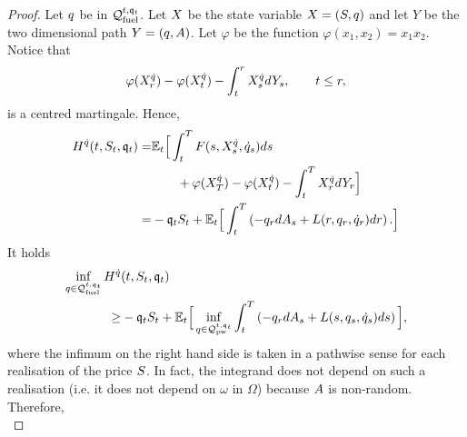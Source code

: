 \documentclass[10pt,a4paper]{article}
\begin{document}
\begin{proof}
Let $q$ be in $\mathcal{Q}_{\text{fuel}}^{t,\mathfrak{q}_t}$. Let $X$ be the state variable  $X = (S,q)$ and let $Y$ be the two dimensional path $Y=(q,A)$. Let $\varphi$ be the function $\varphi(x_1,x_2)=x_1 x_2$. Notice that 
\begin{equation*}
\varphi(X^{\dot{q}}_{r} ) - \varphi(X^{\dot{q}}_{t})
-\int_{t}^{r}X^{\dot{q}}_s dY_s, \qquad t\leq r,
\end{equation*}
is a centred martingale. Hence,
\begin{equation*}
\begin{split}
H^{\dot{q}} (t,S_t,\mathfrak{q}_t) = &
\mathbb{{E}}_t \Big[
\int_{t}^{T} F(s,X^{\dot{q}}_s, \dot{q}_s) ds \\
& \qquad + \varphi (X^{\dot{q}}_T)
- \varphi (X^{\dot{q}}_t)
-\int_{t}^{T} X^{\dot{q}}_r dY_r 
\Big] \\
=& - \mathfrak{q}_t S_t 
+\mathbb{{E}}_t \Big[
\int_{t}^{T} \left(-q_r dA_s + L(r,q_r,\dot{q}_r)dr\right).
\Big]
\end{split}
\end{equation*}
It holds
\begin{equation*}
\begin{split}
\inf_{q\in \mathcal{Q}_{\text{fuel}}^{t,\mathfrak{q}_t}}
H^{\dot{q}} &(t,S_t,\mathfrak{q}_t)\\
\geq& 
-\mathfrak{q}_t S_t
+ \mathbb{{E}}_t \Big[
\inf_{q \in \mathcal{Q}_{\text{pw}}^{t,\mathfrak{q}_t}}
\int_{t}^{T} \left(-q_r dA_s + L(s,q_s,\dot{q}_s)ds\right)
\Big],
\end{split}
\end{equation*}
where the infimum on the right hand side is taken in a pathwise sense for each realisation of the price $S$. In fact, the integrand does not depend on such a realisation (i.e. it does not depend on $\omega$ in $\Omega$) because $A$ is non-random. Therefore, 
\begin{equation*}

\end{equation*}
\end{proof}
\end{document}

